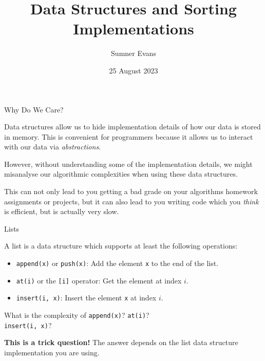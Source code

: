 \documentclass{algo}
\title{Data Structures and Sorting Implementations}
\author{Sumner Evans}
\date{25 August 2023}
\institute{Colorado School of Mines}
\begin{document}
\begin{frame}{Why Do We Care?}

    Data structures allow us to hide implementation details of how our data is
    stored in memory. This is convenient for programmers because it allows us to
    interact with our data via \textit{abstractions}.
    \pause

    However, without understanding some of the implementation details, we might
    misanalyse our algorithmic complexities when using these data structures.
    \pause

    This can not only lead to you getting a bad grade on your algorithms
    homework assignments or projects, but it can also lead to you writing code
    which you \textit{think} is efficient, but is actually very slow.

\end{frame}

\begin{frame}{Lists}

    A list is a data structure which supports at least the following operations:

    \begin{itemize}
        \item \texttt{append(x)} or \texttt{push(x)}: Add the element \texttt{x}
            to the end of the list.
        \item \texttt{at(i)} or the \texttt{[i]} operator: Get the element at
            index $i$.
        \item \texttt{insert(i, x)}: Insert the element \texttt{x} at index $i$.
    \end{itemize}
    \pause

    What is the complexity of \texttt{append(x)}? \texttt{at(i)}? \\
    \texttt{insert(i, x)}?
    \pause

    \textbf{This is a trick question!} The answer depends on the list data
    structure implementation you are using.

\end{frame}
\end{document}
